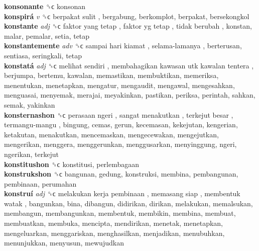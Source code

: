 \textbf{konsonante} ␝ϲ  konsonan  \\
\textbf{konspirá} \emph{v}  ␝ϲ   berpakat sulit , bergabung, berkomplot, berpakat, bersekongkol  \\
\textbf{konstante} \emph{adj}  ␝ϲ   faktor yang tetap ,  faktor yg tetap ,  tidak berubah , konstan, malar, pemalar, setia, tetap  \\
\textbf{konstantemente} \emph{adv}  ␝ϲ   sampai hari kiamat ,  selama-lamanya , berterusan, sentiasa, seringkali, tetap  \\
\textbf{konstatá} \emph{adj}  ␝ϲ   melihat sendiri ,  membahagikan kawasan utk kawalan tentera , berjumpa, bertemu, kawalan, memastikan, membuktikan, memeriksa, menentukan, menetapkan, mengatur, mengaudit, mengawal, mengesahkan, menguasai, menyemak, merajai, meyakinkan, pastikan, periksa, perintah, sahkan, semak, yakinkan  \\
\textbf{konsternashon} ␝ϲ   perasaan ngeri ,  sangat menakutkan ,  terkejut besar ,  termangu-mangu , bingung, cemas, gerun, kecemasan, kekejutan, kengerian, ketakutan, menakutkan, mencemaskan, mengecewakan, mengejutkan, mengerikan, menggera, menggerunkan, menggusarkan, menyinggung, ngeri, ngerikan, terkejut  \\
\textbf{konstitushon} ␝ϲ  konstitusi, perlembagaan  \\
\textbf{konstrukshon} ␝ϲ  bangunan, gedung, konstruksi, membina, pembangunan, pembinaan, perumahan  \\
\textbf{konstruí} \emph{adj}  ␝ϲ   melakukan kerja pembinaan ,  memasang siap ,  membentuk watak , bangunkan, bina, dibangun, didirikan, dirikan, melakukan, memalsukan, membangun, membangunkan, membentuk, membikin, membina, membuat, membuatkan, membuka, mencipta, mendirikan, menetak, menetapkan, mengeluarkan, menggariskan, menghasilkan, menjadikan, menubuhkan, menunjukkan, menyusun, mewujudkan  \\
